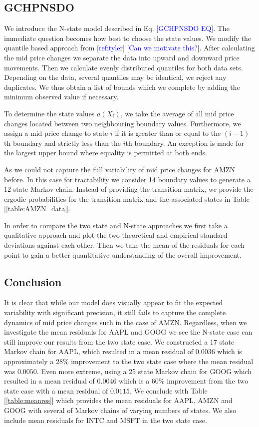 \documentclass{article}
\begin{document}
\subsection*{GCHPNSDO}

We introduce the N-state model described in Eq. [\textcolor{blue}{GCHPNSDO EQ}]. The immediate question becomes how best to choose the state values. We modify the quantile based approach from [\textcolor{blue}{ref:tyler}] [\textcolor{blue}{Can we motivate this?}]. After calculating the mid price changes we separate the data into upward and downward price movements. Then we calculate evenly distributed quantiles for both data sets. Depending on the data, several quantiles may be identical, we reject any duplicates. We thus obtain a list of bounds which we complete by adding the minimum observed value if necessary.

To determine the state values $a(X_i)$, we take the average of all mid price changes located between two neighbouring boundary values. Furthermore, we assign a mid price change to state $i$ if it is greater than or equal to the $(i-1)$th boundary and strictly less than the $i$th boundary. An exception is made for the largest upper bound where equality is permitted at both ends.

As we could not capture the full variability of mid price changes for AMZN before. In this case for tractability we consider 14 boundary values to generate a 12-state Markov chain. Instead of providing the transition matrix, we provide the ergodic probabilities for the transition matrix and the associated states in Table [\ref{table:AMZN_data}].

In order to compare the two state and N-state approaches we first take a qualitative approach and plot the two theoretical and empirical standard deviations against each other. Then we take the mean of the residuals for each point to gain a better quantitative understanding of the overall improvement.

\subsection*{Conclusion}

It is clear that while our model does visually appear to fit the expected variability with significant precision, it still fails to capture the complete dynamics of mid price changes such in the case of AMZN. Regardless, when we investigate the mean residuals for AAPL and GOOG we see the N-state case can still improve our results from the two state case. We constructed a 17 state Markov chain for AAPL, which resulted in a mean residual of $0.0036$ which is approximately a 28\% improvement to the two state case where the mean residual was $0.0050$. Even more extreme, using a 25 state Markov chain for GOOG which resulted in a mean residual of $0.0046$ which is a 60\% improvement from the two state case with a mean residual of $0.0115$. We conclude with Table [\ref{table:meanres}] which provides the mean residuals for AAPL, AMZN and GOOG with several of Markov chains of varying numbers of states. We also include mean residuals for INTC and MSFT in the two state case.
\end{document}
